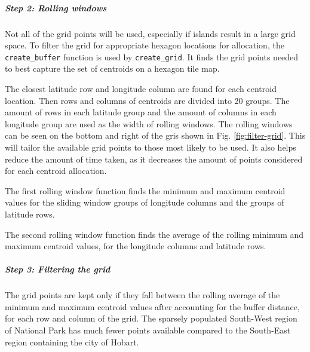 \documentclass{monashthesis}
\begin{document}
\hypertarget{step-2-rolling-windows}{%
\subparagraph{Step 2: Rolling windows}\label{step-2-rolling-windows}}

Not all of the grid points will be used, especially if islands result in a large grid space.
To filter the grid for appropriate hexagon locations for allocation, the \texttt{create\_buffer} function is used by \texttt{create\_grid}.
It finds the grid points needed to best capture the set of centroids on a hexagon tile map.

The closest latitude row and longitude column are found for each centroid location. Then rows and columns of centroids are divided into 20 groups.
The amount of rows in each latitude group and the amount of columns in each longitude group are used as the width of rolling windows. The rolling windows can be seen on the bottom and right of the gris shown in Fig. \ref{fig:filter-grid}.
This will tailor the available grid points to those most likely to be used.
It also helps reduce the amount of time taken, as it decreases the amount of points considered for each centroid allocation.

The first rolling window function finds the minimum and maximum centroid values for the sliding window groups of longitude columns and the groups of latitude rows.

The second rolling window function finds the average of the rolling minimum and maximum centroid values, for the longitude columns and latitude rows.

\hypertarget{step-3-filtering-the-grid}{%
\subparagraph{Step 3: Filtering the grid}\label{step-3-filtering-the-grid}}

The grid points are kept only if they fall between the rolling average of the minimum and maximum centroid values after accounting for the buffer distance, for each row and column of the grid. The sparsely populated South-West region of National Park has much fewer points available compared to the South-East region containing the city of Hobart.
\end{document}
